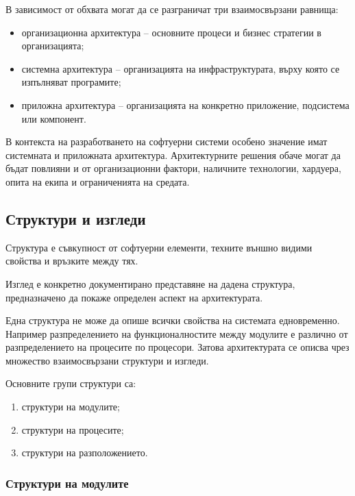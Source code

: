 В зависимост от обхвата могат да се разграничат три взаимосвързани равнища:

\begin{itemize}
    \item организационна архитектура -- основните процеси и бизнес стратегии в организацията;
    \item системна архитектура -- организацията на инфраструктурата, върху която се изпълняват програмите;
    \item приложна архитектура -- организацията на конкретно приложение, подсистема или компонент.
\end{itemize}

В контекста на разработването на софтуерни системи особено значение имат системната и приложната архитектура. Архитектурните решения обаче могат да бъдат повлияни и от организационни фактори, наличните технологии, хардуера, опита на екипа и ограниченията на средата.

\subsection{Структури и изгледи}\label{s:27.1.1}

\begin{defn}
Структура е съвкупност от софтуерни елементи, техните външно видими свойства и връзките между тях.
\end{defn}

\begin{defn}
Изглед е конкретно документирано представяне на дадена структура, предназначено да покаже определен аспект на архитектурата.
\end{defn}

Една структура не може да опише всички свойства на системата едновременно. Например разпределението на функционалностите между модулите е различно от разпределението на процесите по процесори. Затова архитектурата се описва чрез множество взаимосвързани структури и изгледи.

Основните групи структури са:

\begin{enumerate}
    \item структури на модулите;
    \item структури на процесите;
    \item структури на разположението.
\end{enumerate}

\subsubsection{Структури на модулите}

